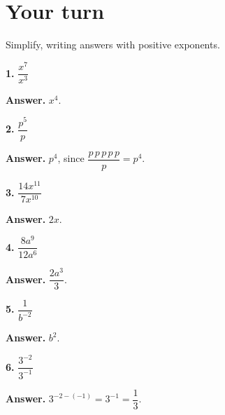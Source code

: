 \documentclass{ximera}
\begin{document}
\section*{Your turn}

Simplify, writing answers with positive exponents.

\begin{problem}

\textbf{1.} $\dfrac{x^{7}}{x^{3}}$ \qquad

\begin{hint}
\textbf{Answer.} $x^{4}$.
\end{hint}
\end{problem}

\begin{problem}

\textbf{2.} $\dfrac{p^{5}}{p}$ \qquad

\begin{hint}
\textbf{Answer.} $p^{4}$, since
$\dfrac{p\,p\,p\,p\,p}{p}=p^{4}$.
\end{hint}
\end{problem}

\begin{problem}

\textbf{3.} $\dfrac{14x^{11}}{7x^{10}}$ \qquad

\begin{hint}
\textbf{Answer.} $2x$.
\end{hint}
\end{problem}

\begin{problem}

\textbf{4.} $\dfrac{8a^{9}}{12a^{6}}$ \qquad

\begin{hint}
\textbf{Answer.} $\dfrac{2a^{3}}{3}$.
\end{hint}
\end{problem}

\begin{problem}

\textbf{5.} $\dfrac{1}{b^{-2}}$ \qquad

\begin{hint}
\textbf{Answer.} $b^{2}$.
\end{hint}
\end{problem}

\begin{problem}

\textbf{6.} $\dfrac{3^{-2}}{3^{-1}}$ \qquad

\begin{hint}
\textbf{Answer.}
$3^{-2-(-1)}=3^{-1}=\dfrac{1}{3}$.
\end{hint}
\end{problem}
\end{document}
